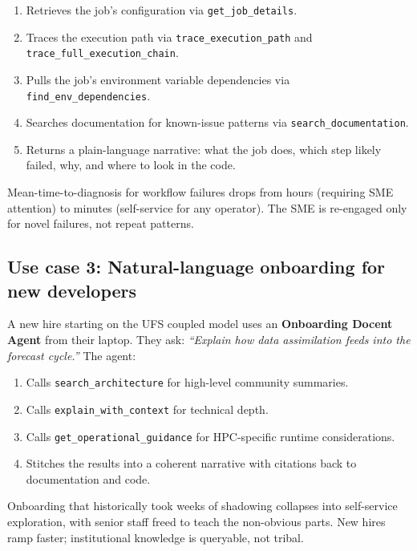 \documentclass[11pt,letterpaper]{article}
\begin{document}
\begin{enumerate}[leftmargin=*, itemsep=1pt]
  \item Retrieves the job's configuration via
        \texttt{get\_job\_details}.
  \item Traces the execution path via
        \texttt{trace\_execution\_path} and
        \texttt{trace\_full\_execution\_chain}.
  \item Pulls the job's environment variable dependencies via
        \texttt{find\_env\_dependencies}.
  \item Searches documentation for known-issue patterns via
        \texttt{search\_documentation}.
  \item Returns a plain-language narrative: what the job does, which
        step likely failed, why, and where to look in the code.
\end{enumerate}

\begin{impact}
Mean-time-to-diagnosis for workflow failures drops from hours (requiring
SME attention) to minutes (self-service for any operator). The SME is
re-engaged only for novel failures, not repeat patterns.
\end{impact}

\subsection{Use case 3: Natural-language onboarding for new developers}

A new hire starting on the UFS coupled model uses an
\textbf{Onboarding Docent Agent} from their laptop. They ask:
\textit{``Explain how data assimilation feeds into the forecast cycle.''}
The agent:

\begin{enumerate}[leftmargin=*, itemsep=1pt]
  \item Calls \texttt{search\_architecture} for high-level community
        summaries.
  \item Calls \texttt{explain\_with\_context} for technical depth.
  \item Calls \texttt{get\_operational\_guidance} for HPC-specific
        runtime considerations.
  \item Stitches the results into a coherent narrative with citations
        back to documentation and code.
\end{enumerate}

\begin{impact}
Onboarding that historically took weeks of shadowing collapses into
self-service exploration, with senior staff freed to teach the
non-obvious parts. New hires ramp faster; institutional knowledge is
queryable, not tribal.
\end{impact}
\end{document}

